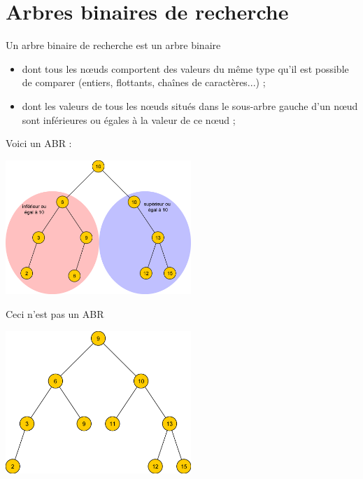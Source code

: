 \documentclass[10pt,firamath,cours]{nsi}
\begin{document}
\setcounter{chapter}{12}
\chapter{Arbres binaires de recherche}
\begin{definition}[]
    Un arbre binaire de recherche est un arbre binaire
    \begin{itemize}
        \item dont tous les n\oe uds comportent des valeurs du même type qu'il est possible de comparer (entiers, flottants, chaînes de caractères...) ;
        \item dont les valeurs de tous les n\oe uds situés dans le \alert{sous-arbre gauche} d'un n\oe ud sont \alert{inférieures ou égales} à la valeur de ce n\oe ud ;
    \end{itemize}   
\end{definition}
\begin{exemple}[s]
    Voici un ABR :
    \begin{center}
    \includegraphics[width=7cm]{img/abr1}
    \end{center} 
    Ceci n'est pas un ABR
    \begin{center}
        \includegraphics[width=7cm]{img/abr2}
    \end{center}
\end{exemple}
\end{document}
